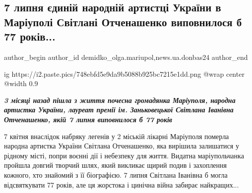  
 
 
 
 
 
\subsection{7 липня єдиній народній артистці України в Маріуполі Світлані Отченашенко виповнилося б 77 років...}
\label{sec:07_07_2022.stz.news.ua.donbas24.1.otchenashenko_77_rokiv}
 
\ifcmt
 author_begin
   author_id demidko_olga.mariupol,news.ua.donbas24
 author_end
\fi

\ifcmt
  ig https://i2.paste.pics/748ebfd5e9da9b5088b925bc7215e1dd.png
  @wrap center
  @width 0.9
\fi

\begin{center}
  \em\color{blue}\bfseries\Large
3 місяці назад пішла з життя почесна громадянка Маріуполя, народна артистка
України, лауреат премії ім. Заньковецької Світлана Іванівна
Отченашенко, якій 7 липня виповнилося б 77 років
\end{center}

7 квітня внаслідок набряку легенів у 2 міській лікарні Маріуполя померла
народна артистка України Світлана Отченашенко, яка вирішила залишатися у
рідному місті, попри воєнні дії і небезпеку для життя. Видатна маріупольчанка
пройшла довгий творчий шлях, який викликає щирий подив і захоплення кожного,
хто знайомий з її біографією. 7 липня Світлана Іванівна б могла відсвяткувати
77 років, але ця жорстока і цинічна війна забирає найкращих... 

